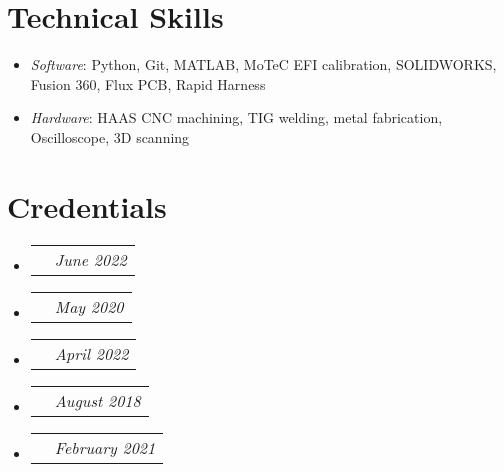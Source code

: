 \documentclass[letterpaper,11pt]{article}
\makeatletter
\newcommand{\resumeItem}[1]{
  \item\small{
    {#1 \vspace{-2pt}}
  }
}
\newcommand{\credential}[2]{
  \item
    \begin{tabular*}{0.94\textwidth}[t]{l@{\extracolsep{\fill}}r}
      \text{\small#1} & \textit{\small #2} \\
    \end{tabular*}\vspace{-7pt}
}
\newcommand{\resumeItemListStart}{\begin{itemize}}
\newcommand{\resumeItemListEnd}{\end{itemize}\vspace{-5pt}}
\newcommand{\credentialListStart}{\begin{itemize}}
\newcommand{\credentialListEnd}{\end{itemize}\vspace{-5pt}}
\makeatother
\begin{document}
\section{Technical Skills}
    \resumeItemListStart
        \resumeItem{\textit{Software}{: Python, Git, MATLAB, MoTeC EFI calibration, SOLIDWORKS, Fusion 360, Flux PCB, Rapid Harness}} \vspace{-5pt}
        \resumeItem{\textit{Hardware}{: HAAS CNC machining, TIG welding, metal fabrication, Oscilloscope, 3D scanning}}
    \resumeItemListEnd
 \vspace{-16pt}

\section{Credentials}
    \credentialListStart
        \credential{United States Government Security Clearance}{June 2022}
        \credential{Certified SOLIDWORKS Associate (CSWA) - Mechanical Design}{May 2020}
        \credential{Certified SOLIDWORKS Associate (CSWA) - Simulation}{April 2022}
        \credential{Eagle Scout - Boy Scounts of America}{August 2018}
        \credential{Level 1 Alpine Certification - Professional Ski Instructors of America (PSIA) }{February 2021}
    \credentialListEnd
    
\end{document}
